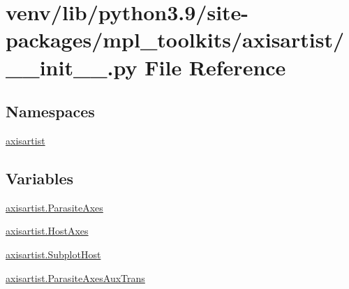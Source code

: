 \hypertarget{venv_2lib_2python3_89_2site-packages_2mpl__toolkits_2axisartist_2____init_____8py}{}\section{venv/lib/python3.9/site-\/packages/mpl\+\_\+toolkits/axisartist/\+\_\+\+\_\+init\+\_\+\+\_\+.py File Reference}
\label{venv_2lib_2python3_89_2site-packages_2mpl__toolkits_2axisartist_2____init_____8py}
\subsection*{Namespaces}
\begin{DoxyCompactItemize}
\item 
 \hyperlink{namespaceaxisartist}{axisartist}
\end{DoxyCompactItemize}
\subsection*{Variables}
\begin{DoxyCompactItemize}
\item 
\hyperlink{namespaceaxisartist_ae4d99a2caea9dbf561868b1f89814cef}{axisartist.\+Parasite\+Axes}
\item 
\hyperlink{namespaceaxisartist_a286fba185c1a62b1c0b4cf36b6218695}{axisartist.\+Host\+Axes}
\item 
\hyperlink{namespaceaxisartist_aa70ccce4828b2adca29edc631ba1b4e9}{axisartist.\+Subplot\+Host}
\item 
\hyperlink{namespaceaxisartist_ad039937f6cac4bbd8c10fbbc982fef16}{axisartist.\+Parasite\+Axes\+Aux\+Trans}
\end{DoxyCompactItemize}
